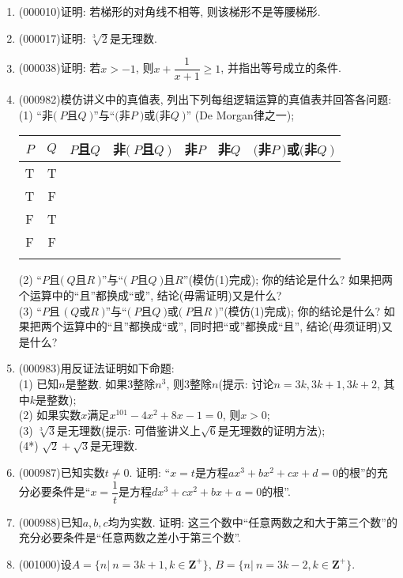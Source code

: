 \documentclass[10pt,a4paper]{article}
\begin{document}
\begin{enumerate}[1.]

\item {\tiny (000010)}证明: 若梯形的对角线不相等, 则该梯形不是等腰梯形.
\item {\tiny (000017)}证明: $\sqrt[3]{2}$是无理数.
\item {\tiny (000038)}证明: 若$x>-1$, 则$x+\dfrac 1{x+1}\ge 1$, 并指出等号成立的条件.
\item {\tiny (000982)}模仿讲义中的真值表, 列出下列每组逻辑运算的真值表并回答各问题:\\ 
(1) ``非$(\ P$且$Q\ )$''与``$($非$P\ )$或$($非$Q\ )$'' (De Morgan律之一);
\begin{center}
\begin{tabular}{|c|c||c|c||c|c|c||}
\hline
$P$ & $Q$ & $P$且$Q$ & 非$(\ P$且$Q\ )$ & 非$P$ & 非$Q$ & $($非$P\ )$或$($非$Q\ )$\\
\hline
T & T &&&&&\\
\hline
T & F &&&&&\\
\hline
F & T &&&&&\\
\hline
F & F &&&&&\\
\hline\\ 
\end{tabular}
\end{center} 
(2) ``$P$且$(\ Q$且$R\ )$''与``$(\ P$且$Q\ )$且$R$''(模仿(1)完成); 你的结论是什么? 如果把两个运算中的``且''都换成``或'', 结论(毋需证明)又是什么?\\ 
(3) ``$P$且 $(\ Q$或$R\ )$''与``$(\ P$且$Q\ )$或$(\ P$且$R\ )$''(模仿(1)完成); 你的结论是什么? 如果把两个运算中的``且''都换成``或'', 同时把``或''都换成``且'', 结论(毋须证明)又是什么?
\item {\tiny (000983)}用反证法证明如下命题:\\ 
(1) 已知$n$是整数. 如果$3$整除$n^3$, 则$3$整除$n$(提示: 讨论$n=3k,3k+1,3k+2$, 其中$k$是整数);\\ 
(2) 如果实数$x$满足$x^{101}-4x^2+8x-1=0$, 则$x>0$;\\ 
(3) $\sqrt[3]{3}$是无理数(提示: 可借鉴讲义上$\sqrt{6}$是无理数的证明方法);\\ 
(4*) $\sqrt{2}+\sqrt{3}$是无理数.
\item {\tiny (000987)}已知实数$t\ne 0$. 证明: ``$x=t$是方程$a x^3+b x^2+cx+d=0$的根''的充分必要条件是``$x=\dfrac{1}{t}$是方程$d x^3+c x^2+ b x+a=0$的根''.
\item {\tiny (000988)}已知$a,b,c$均为实数. 证明: 这三个数中``任意两数之和大于第三个数''的充分必要条件是``任意两数之差小于第三个数''.
\item {\tiny (001000)}设$A=\{n|\ n=3k+1,k \in \mathbf{Z}^+\}$, $B=\{n|\ n=3k-2,k \in \mathbf{Z}^+\}$.\\ 

\end{enumerate}
\end{document}
